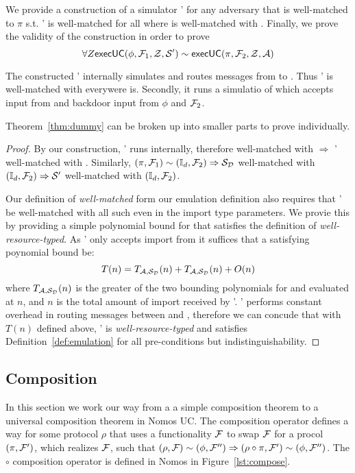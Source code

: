 We provide a construction of a simulator \Simulator' for any adversary \Adversary that is well-matched to $\pi$ s.t. \Simulator' is well-matched for all \Environment where \Adversary is well-matched with \Environment.
Finally, we prove the validity of the construction in order to prove 
\[
\forall Z {\mathsf {execUC}} (\phi, \mathcal{F}_1, \mathcal{Z}, \mathcal{S}') \sim {\mathsf {execUC}}(\pi, \mathcal{F}_2, \mathcal{Z}, \mathcal{A})
\]

The constructed \Simulator' internally simulates \Adversary and routes messages from \Environment to \Adversary.
Thus \Simulator' is well-matched with \Environment everywere \Adversary is.
Secondly, it runs a simulatio of \Dummysim which accepts input from \Adversary and backdoor input from $\phi$ and $\mathcal{F}_2$.

Theorem~\ref{thm:dummy} can be broken up into smaller parts to prove individually.

\begin{proof}
By our construction, \Simulator' runs \Adversary internally, therefore \Adversary well-matched with \Environment $\Rightarrow$ \Simulator' well-matched with \Environment.
Similarly, $(\pi, \mathcal{F}_1) \sim (\mathbb{I}_d, \mathcal{F}_2) \Rightarrow \mathcal{S}_{\mathcal{D}}$ well-matched with $(\mathbb{I}_d, \mathcal{F}_2) \Rightarrow \mathcal{S}'$ well-matched with $(\mathbb{I}_d, \mathcal{F}_2)$.

Our definition of \textit{well-matched} form our emulation definition also requires that \Simulator' be well-matched with all such \Environment even in the import type parameters. 
We provie this by providing a simple polynomial bound for \Simulator that satisfies the definition of \textit{well-resource-typed}.
As \Simulator' only accepts import from \Environment it suffices that a satisfying poynomial bound be: 
\[
T(n) = T_{\mathcal{A},\mathcal{S}_{\mathcal{D}}}(n) + T_{\mathcal{A},\mathcal{S}_{\mathcal{D}}}(n) + O(n)
\]
where $T_{\mathcal{A},\mathcal{S}_{\mathcal{D}}}(n)$ is the greater of the two bounding polynomials for \Dummysim and \Adversary evaluated at $n$, and $n$ is the total amount of import received by \Simulator'.
\Simulator' performs constant overhead in routing messages between \Adversary and \Dummysim, therefore we can concude that with $T(n)$ defined above, \Simulator' is \textit{well-resource-typed} and satisfies Definition~\ref{def:emulation} for all pre-conditions but indistinguishability.

\end{proof}

\subsection{Composition}
In this section we work our way from a a simple composition theorem to a universal composition theorem in Nomos UC.
The composition operator defines a way for some protocol $\rho$ that uses a functionality $\mathcal{F}$ to swap $\mathcal{F}$ for a procol $(\pi, \mathcal{F}')$, which realizes $\mathcal{F}$, such that $(\rho, \mathcal{F}) \sim (\phi, \mathcal{F}'') \Rightarrow (\rho \circ \pi, \mathcal{F}') \sim (\phi, \mathcal{F}'')$.
The $\circ$ composition operator is defined in Nomos in Figure~\ref{lst:compose}.

